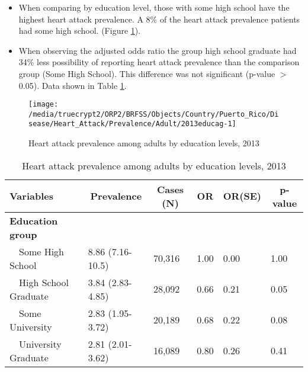 \newpage
\begin{itemize}

\item When comparing by education level, those with
some high school
have the highest heart attack prevalence. A 8\% of the heart attack prevalence patients had some high school.
(Figure \ref{fig:edu.Heart_Attack.2013}).

\item 
When observing the adjusted odds ratio the group high school graduate had 34\% less possibility of reporting heart attack prevalence than the comparison group (Some High School).
This difference was not significant (p-value $>$ 0.05).  Data shown in Table \ref{tab:edu.Heart_Attack.2013}.

\end{itemize}

\begin{figure}[H]
\caption{Heart attack prevalence among adults by education levels, 
         2013}
\begin{knitrout}
\color{fgcolor}

{\centering \texttt{[image: /media/truecrypt2/ORP2/BRFSS/Objects/Country/Puerto\_Rico/Disease/Heart\_Attack/Prevalence/Adult/2013educag-1]} 

}



\end{knitrout}
 \label{fig:edu.Heart_Attack.2013}
\end{figure}

\begin{table}[H]
\caption{Heart attack prevalence  among adults by education levels, 2013\label{tab:edu.Heart_Attack.2013}} 
\begin{center}
\begin{tabular}{llllll}
\hline\hline
\multicolumn{1}{l}{Variables}&\multicolumn{1}{c}{Prevalence}&\multicolumn{1}{c}{Cases (N)}&\multicolumn{1}{c}{OR}&\multicolumn{1}{c}{OR(SE)}&\multicolumn{1}{c}{p-value}\tabularnewline
\hline
{\bfseries Education group}&&&&&\tabularnewline
~~Some High School&8.86 (7.16-10.5)&70,316&1.00&0.00&1.00\tabularnewline
~~High School Graduate&3.84 (2.83-4.85)&28,092&0.66&0.21&0.05\tabularnewline
~~Some University&2.83 (1.95-3.72)&20,189&0.68&0.22&0.08\tabularnewline
~~University Graduate&2.81 (2.01-3.62)&16,089&0.80&0.26&0.41\tabularnewline
\hline
\end{tabular}\end{center}

\end{table}

